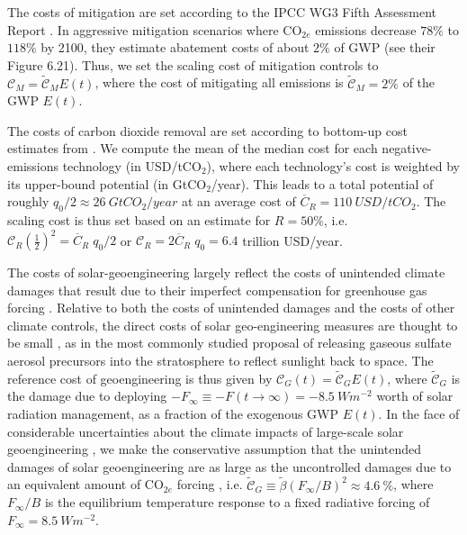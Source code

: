 \documentclass[9pt,twocolumn,twoside,lineno]{pnas-new}
\begin{document}
{The costs of mitigation are set according to the IPCC WG3 Fifth Assessment Report \cite{}. In aggressive mitigation scenarios where CO$_{2e}$ emissions decrease $78\%$ to $118\%$ by 2100, they estimate abatement costs of about $2\%$ of GWP (see their Figure 6.21). Thus, we set the scaling cost of mitigation controls to $\mathcal{C}_{M} = \tilde{\mathcal{C}}_{M} E(t)$, where the cost of mitigating all emissions is $\tilde{\mathcal{C}}_{M} = 2\%$ of the GWP $E(t)$.

The costs of carbon dioxide removal are set according to bottom-up cost estimates from \cite[][their Table 2]{fuss_negative_2018}. We compute the mean of the median cost for each negative-emissions technology (in USD/tCO$_{2}$), where each technology's cost is weighted by its upper-bound potential (in GtCO$_{2}$/year). This leads to a total potential of roughly $q_{0}/2 \approx \SI{26}{GtCO_{2}/year}$ at an average cost of $\overline{C}_{R}= \SI{110}{USD/tCO_{2}}$. The scaling cost is thus set based on an estimate for $R=50\%$, i.e. $\mathcal{C}_{R} \left(\frac{1}{2} \right)^{2} = \overline{C}_{R}\; q_{0} /2$ or $\mathcal{C}_{R} = 2 \overline{C}_{R}\; q_{0} = 6.4$ trillion USD/year.

The costs of solar-geoengineering largely reflect the costs of unintended climate damages that result due to their imperfect compensation for greenhouse gas forcing \cite{irvine_towards_2017}. Relative to both the costs of unintended damages and the costs of other climate controls, the direct costs of solar geo-engineering measures are thought to be small \citep{mcclellan_cost_2012}, as in the most commonly studied proposal of releasing gaseous sulfate aerosol precursors into the stratosphere to reflect sunlight back to space. The reference cost of geoengineering is thus given by $\mathcal{C}_{G}(t) = \tilde{\mathcal{C}}_{G} E(t)$, where $\tilde{\mathcal{C}}_{G}$ is the damage due to deploying $-F_{\infty} \equiv -F(t \rightarrow \infty) = \SI{-8.5}{W m^{-2}}$ worth of solar radiation management, as a fraction of the exogenous GWP $E(t)$. In the face of considerable uncertainties about the climate impacts of large-scale solar geoengineering \citep{irvine_towards_2017}, we make the conservative assumption that the unintended damages of solar geoengineering are as large as the uncontrolled damages due to an equivalent amount of CO$_{2e}$ forcing \citep[as in][]{goes_economics_2011, belaia_optimal_2019}, i.e. $\tilde{\mathcal{C}}_{G} \equiv \tilde{\beta} (F_{\infty}/B)^{2} \approx \SI{4.6}{\%}$, where $F_{\infty}/B$ is the equilibrium temperature response to a fixed radiative forcing of $F_{\infty} = \SI{8.5}{W m^{-2}}$.

}
\end{document}
